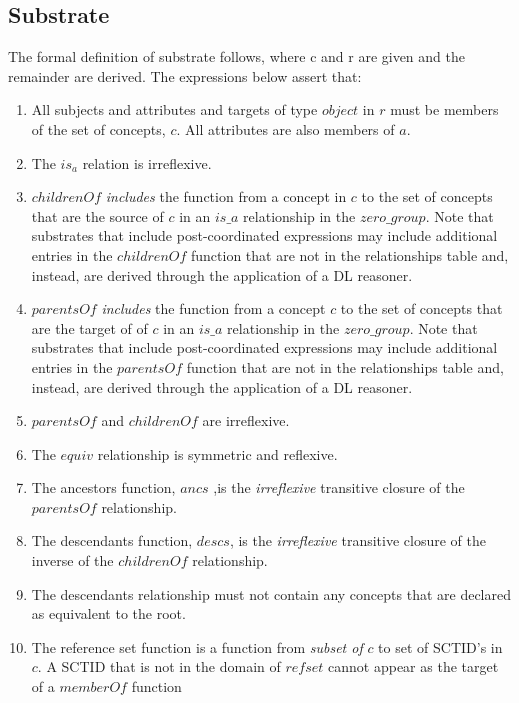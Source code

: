 \documentclass{article}
\begin{document}
\subsection{Substrate}
The formal definition of substrate follows, where c and r are given and the remainder are derived.  The expressions below assert that:
\begin{enumerate}
\item All subjects and attributes and targets of type $object$ in $r$  must be members of the set of concepts, $c$.  All attributes are also members of $a$.
\item The $is_a$ relation is irreflexive.
\item $childrenOf$ \emph{includes} the function from a concept in $c$ to the set of concepts that are the source of $c$ in an $is\_a$ relationship in the $zero\_group$.  Note that 
substrates that include post-coordinated expressions may include additional entries in the $childrenOf$ function that are not in the relationships table and, instead, are derived 
through the application of a DL reasoner.
\item $parentsOf$ \emph{includes} the function from a concept $c$ to the set of concepts that are the target of of $c$ in an $is\_a$ relationship in the $zero\_group$.  Note that 
substrates that include post-coordinated expressions may include additional entries in the $parentsOf$ function that are not in the relationships table and, instead, are derived 
through the application of a DL reasoner.
\item $parentsOf$ and $childrenOf$ are irreflexive.
\item The $equiv$ relationship is symmetric and reflexive.
\item The ancestors function, $ancs$ ,is the \emph{irreflexive} transitive closure of the $parentsOf$ relationship.
\item The descendants function, $descs$, is the  \emph{irreflexive} transitive closure of the inverse of the $childrenOf$ relationship. 
\item The descendants relationship must not contain any concepts that are declared as equivalent to the root.
\item The reference set function is a function from  \emph{subset of} $c$ to set of SCTID's in $c$.  A SCTID that is not in the domain of $refset$ cannot appear as the target of a $memberOf$ function
\end{enumerate}
\end{document}
